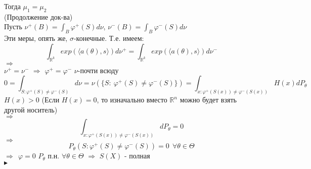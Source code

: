 \documentclass{article}
\begin{document}
Тогда $\mu_1 = \mu_2$\\
(Продолжение док-ва)\\
Пусть $\nu^+(B) = \int_B{\varphi^+(S)d\nu}$, $\nu^-(B) = \int_B{\varphi^-(S)d\nu}$\\
Эти меры, опять же, $\sigma$-конечные. Т.е. имеем:
$$ \int_{\mathbb{R}^k}{exp(\langle a(\theta), s  \rangle)d\nu^+} = \int_{\mathbb{R}^k}{exp(\langle a(\theta), s  \rangle)d\nu^-}$$
$\Rightarrow$\\
$\nu^+ = \nu^-$ $\Rightarrow$ $\varphi^+ = \varphi^-$ $\nu$-почти всюду\\
$$ 0 = \int_{S: \varphi^+(S) \neq \varphi^-(S)}{d\nu} = \nu(\{ S:\ \varphi^+(S)\neq\varphi^-(S)  \}) = \int_{x: \varphi^+(S(x))\neq\varphi^-(S(x))}{H(x)dP_\theta}$$
$H(x)>0$ (Если $H(x) = 0$, то изначально вместо $\mathbb{R}^n$ можно будет взять другой носитель)\\
$\Rightarrow$
$$ \int_{x: \varphi^+(S(x))\neq\varphi^-(S(x))}{dP_\theta} = 0 $$
$\Rightarrow$
$$ P_\theta(S: \varphi^+(S) \neq \varphi^-(S)) = 0\ \ \forall\theta\in\Theta $$
$\Rightarrow\ \ \varphi = 0$ $P_\theta$ п.н. $\forall\theta\in\Theta$ $\Rightarrow$ $S(X)$ - полная\\
$\blacktriangleright$\\
\end{document}
